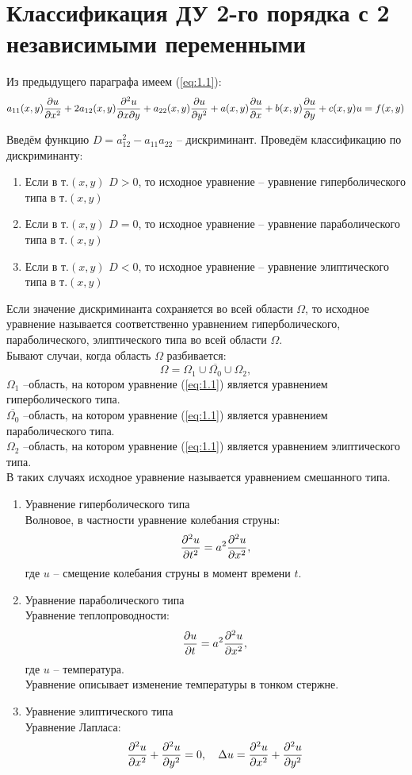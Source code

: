 \documentclass[../main.tex]{subfiles}
\begin{document}
\section{Классификация ДУ 2-го порядка с 2 независимыми переменными}
Из предыдущего параграфа имеем (\ref{eq:1.1}):
\[
	a_{11}(x,y)\frac{\partial u}{\partial x^2} + 2a_{12}(x,y)\frac{\partial ^2u}{\partial x \partial{y}} +
	a_{22}(x,y)\frac{\partial u}{\partial y^2} + a(x,y)\frac{\partial u}{\partial x} + b(x,y)\frac{\partial u}{\partial y} + c(x,y)u = f(x,y)
\]

Введём функцию $D = a_{12}^2-a_{11}a_{22}$ -- дискриминант.
Проведём классификацию по дискриминанту:
\begin{enumerate}
	\item
	      Если в т.$(x,y)$ $D>0$, то исходное уравнение --
	      уравнение гиперболического типа в т.$(x,y)$
	\item
	      Если в т.$(x,y)$ $D=0$, то исходное уравнение --
	      уравнение параболического типа в т.$(x,y)$
	\item
	      Если в т.$(x,y)$ $D<0$, то исходное уравнение --
	      уравнение элиптического типа в т.$(x,y)$
\end{enumerate}

Если значение дискриминанта сохраняется во всей области $\Omega$,
то исходное уравнение называется соответственно уравнением гиперболического,
параболического, элиптического типа во всей области $\Omega$.\\

Бывают случаи, когда область $\Omega$ разбивается:
\[\Omega = \Omega_1 \cup \overline{\Omega_0} \cup \Omega_2, \]
$\Omega_1$ --область, на котором уравнение (\ref{eq:1.1}) является уравнением гиперболического типа.\\
$\overline{\Omega_0}$ --область, на котором уравнение (\ref{eq:1.1}) является уравнением параболического типа.\\
$\Omega_2$ --область, на котором уравнение (\ref{eq:1.1}) является уравнением элиптического типа.\\
В таких случаях исходное уравнение называется уравнением смешанного типа.

\begin{enumerate}
	\item Уравнение гиперболического типа\\
	      Волновое, в частности уравнение колебания струны:
	      \[\frac{\partial ^2u}{\partial t^2}=a^2\frac{\partial ^2u}{\partial x^2},\]
	      где $u$ -- смещение колебания струны в момент времени $t$.
	\item Уравнение параболического типа\\
	      Уравнение теплопроводности:
	      \[\frac{\partial u}{\partial t}=a^2\frac{\partial ^2u}{\partial x^2},\]
	      где $u$ -- температура.\\
	      Уравнение описывает изменение температуры в тонком стержне.
	\item Уравнение элиптического типа\\
	      Уравнение Лапласа:
	      \[
		      \frac{\partial ^2u}{\partial x^2}+\frac{\partial ^2u}{\partial y^2} = 0,\quad
		      \Delta u=\frac{\partial ^2u}{\partial x^2}+\frac{\partial ^2u}{\partial y^2}
	      \]
\end{enumerate}
\end{document}
